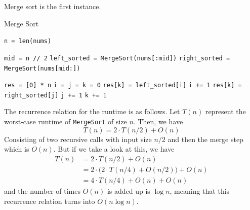 \documentclass{article}
\begin{document}
    \begin{algo}
      Merge sort is the first instance. 
      \begin{algorithm}[H]
        \caption{Merge Sort}
        \label{alg:merge_sort}
        \begin{algorithmic}
            \State \texttt{n = len(nums)}

             
              \State {}
            \EndIf
            \State \texttt{mid = n // 2} 
            \State \texttt{left\_sorted = MergeSort(nums[:mid])} 
            \State \texttt{right\_sorted = MergeSort(nums[mid:])} 

            \State \texttt{res = [0] * n} 
            \State \texttt{i = j = k = 0} 
             
                \State \texttt{res[k] = left\_sorted[i]} 
                \State \texttt{i += 1} 
              \Else 
                \State \texttt{res[k] = right\_sorted[j]}
                \State \texttt{j += 1}
              \EndIf 
              \State \texttt{k += 1}
            \EndWhile

            \State {}
          \EndFunction
        \end{algorithmic}
      \end{algorithm}
      The recurrence relation for the runtime is as follows. Let $T(n)$ represent the worst-case runtime of \texttt{MergeSort} of size $n$. Then, we have 
      \begin{equation}
        T(n) = 2 \cdot T(n/2) + O(n)
      \end{equation}
      Consisting of two recursive calls with input size $n/2$ and then the merge step which is $O(n)$. But if we take a look at this, we have 
      \begin{align}
        T(n) & = 2 \cdot T(n/2) + O(n) \\
             & = 2 \cdot \big( 2 \cdot T(n/4) + O(n/2)) + O(n) \\
             & = 4 \cdot T(n/4) + O(n) + O(n) 
      \end{align}
      and the number of times $O(n)$ is added up is $\log{n}$, meaning that this recurrence relation turns into $O(n \log{n})$. 
    \end{algo}
\end{document}
